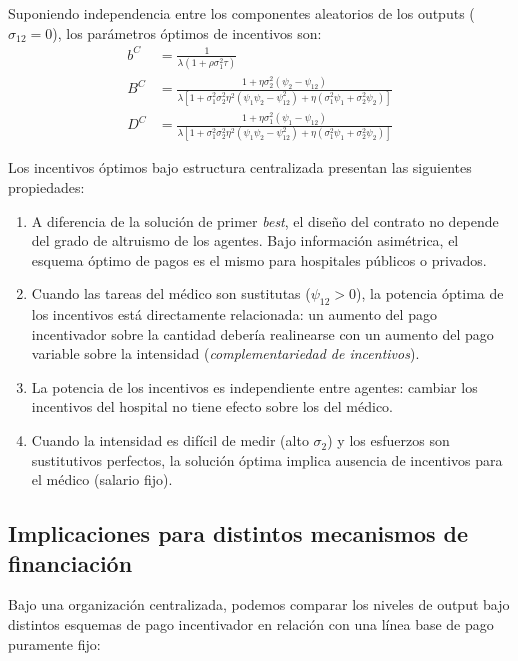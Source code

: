 Suponiendo independencia entre los componentes aleatorios de los outputs ($\sigma_{12}=0$), los parámetros óptimos de incentivos son:
\begin{align}
  b^C &= \frac{1}{\lambda(1+\rho\sigma_1^2\tau)} \label{eq:b_sb}\\
  B^C &= \frac{1+\eta\sigma_2^2(\psi_2-\psi_{12})}{\lambda[1+\sigma_1^2\sigma_2^2\eta^2(\psi_1\psi_2-\psi_{12}^2)+\eta(\sigma_1^2\psi_1+\sigma_2^2\psi_2)]} \label{eq:B_sb}\\
  D^C &= \frac{1+\eta\sigma_1^2(\psi_1-\psi_{12})}{\lambda[1+\sigma_1^2\sigma_2^2\eta^2(\psi_1\psi_2-\psi_{12}^2)+\eta(\sigma_1^2\psi_1+\sigma_2^2\psi_2)]} \label{eq:D_sb}
\end{align}

\begin{result}
\label{res:incentivos_centralizados}
Los incentivos óptimos bajo estructura centralizada presentan las siguientes propiedades:
\begin{enumerate}[label=(\alph*)]
  \item A diferencia de la solución de primer \textit{best}, el diseño del contrato no depende del grado de altruismo de los agentes. Bajo información asimétrica, el esquema óptimo de pagos es el mismo para hospitales públicos o privados.
  \item Cuando las tareas del médico son sustitutas ($\psi_{12}>0$), la potencia óptima de los incentivos está directamente relacionada: un aumento del pago incentivador sobre la cantidad debería realinearse con un aumento del pago variable sobre la intensidad (\textit{complementariedad de incentivos}).
  \item La potencia de los incentivos es independiente entre agentes: cambiar los incentivos del hospital no tiene efecto sobre los del médico.
  \item Cuando la intensidad es difícil de medir (alto $\sigma_2$) y los esfuerzos son sustitutivos perfectos, la solución óptima implica ausencia de incentivos para el médico (salario fijo).
\end{enumerate}
\end{result}

\subsection{Implicaciones para distintos mecanismos de financiación}

Bajo una organización centralizada, podemos comparar los niveles de output bajo distintos esquemas de pago incentivador en relación con una línea base de pago puramente fijo:

